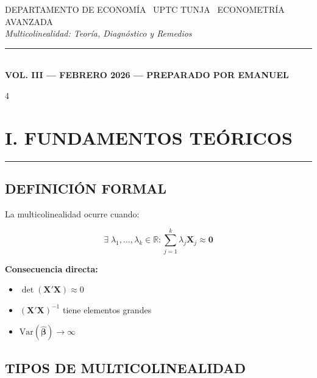 \documentclass[6pt, landscape]{extarticle}
\newcommand{\sectionline}{%
  \nopagebreak\vspace{-4pt}\noindent\textcolor{GoldLeaf}{\rule{\linewidth}{1pt}}\par\vspace{2pt}%
}
\newcommand{\Var}{\text{Var}}
\newcommand{\Xmat}{\mathbf{X}}
\newcommand{\betahat}{\hat{\boldsymbol{\beta}}}
\begin{document}
\begin{center}
    {\sffamily\fontsize{6}{7}\selectfont \color{gray} 
    DEPARTAMENTO DE ECONOMÍA \textbullet\ UPTC TUNJA \textbullet\ ECONOMETRÍA AVANZADA} \\[0.3em]
    {\rmfamily\itshape\fontsize{22}{22}\selectfont \color{DeepBlack} 
    Multicolinealidad: Teoría, Diagnóstico y Remedios} \\[0.2em]
    {\color{GoldLeaf}\rule{0.5\textwidth}{1.2pt}} \\[0.3em]
    {\sffamily\bfseries\fontsize{6}{7}\selectfont 
    VOL. III --- FEBRERO 2026 --- PREPARADO POR EMANUEL}
\end{center}

\vspace{-8pt}

\begin{multicols*}{4}
\raggedcolumns


\section{I. FUNDAMENTOS TEÓRICOS}
\sectionline

\subsection{DEFINICIÓN FORMAL}

La multicolinealidad ocurre cuando:
\begin{formulabox}
\vspace{-3pt}
$$\exists \; \lambda_1, \ldots, \lambda_k \in \mathbb{R} : \sum_{j=1}^{k} \lambda_j \Xmat_j \approx \mathbf{0}$$
\vspace{-3pt}
\end{formulabox}

\textbf{Consecuencia directa:}
\begin{itemize}
    \item $\det(\Xmat'\Xmat) \approx 0$
    \item $(\Xmat'\Xmat)^{-1}$ tiene elementos grandes
    \item $\Var(\betahat) \to \infty$
\end{itemize}

\subsection{TIPOS DE MULTICOLINEALIDAD}


\end{multicols*}
\end{document}
